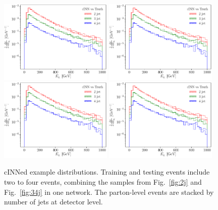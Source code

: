 \begin{figure}[t]
\includegraphics[page = 5, width=0.48\textwidth]{figures/cINN/isrstacked}
\includegraphics[page =10, width=0.48\textwidth]{figures/cINN/isrstacked} \\
\includegraphics[page =12, width=0.48\textwidth]{figures/cINN/isrstacked}
\includegraphics[page =13, width=0.48\textwidth]{figures/cINN/isrstacked}
\caption{cINNed example distributions. Training and testing events
  include two to four events, combining the samples from
  Fig.~\ref{fig:2j} and Fig.~\ref{fig:34j} in one network. The
  parton-level events are stacked by number of jets at detector
  level.}
\label{fig:stacked}
\end{figure}

